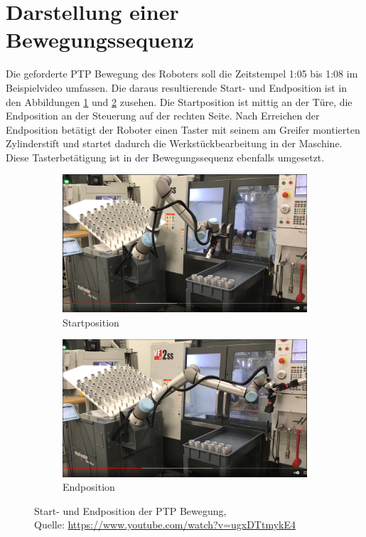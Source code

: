 \section{Darstellung einer Bewegungssequenz}

Die geforderte PTP Bewegung des Roboters soll die Zeitstempel 1:05 bis 1:08 im Beispielvideo umfassen.
Die daraus resultierende Start- und Endposition ist in den Abbildungen \ref{fig:start_pos} und \ref{fig:end_pos} zusehen.
Die Startposition ist mittig an der Türe, die Endposition an der Steuerung auf der rechten Seite. 
Nach Erreichen der Endposition betätigt der Roboter einen Taster mit seinem am Greifer montierten Zylinderstift und startet dadurch die Werkstückbearbeitung in der Maschine.
Diese Tasterbetätigung ist in der Bewegungssequenz ebenfalls umgesetzt.

\begin{figure}
	\centering
	\begin{subfigure}[b]{0.496\textwidth}
		\centering
		\includegraphics[width=1.0\linewidth]{grafic/ptp_startposition}
		\caption{Startposition}
		\label{fig:start_pos}
	\end{subfigure}
	\begin{subfigure}[b]{0.496\textwidth}
		\centering
		\includegraphics[width=1.0\linewidth]{grafic/ptp_endposition}
		\caption{Endposition}
		\label{fig:end_pos}
	\end{subfigure}
\caption{Start- und Endposition der PTP Bewegung, \\ Quelle: \url{https://www.youtube.com/watch?v=ugxDTtmykE4}}
\label{fig:start_end_pos}
\end{figure}


